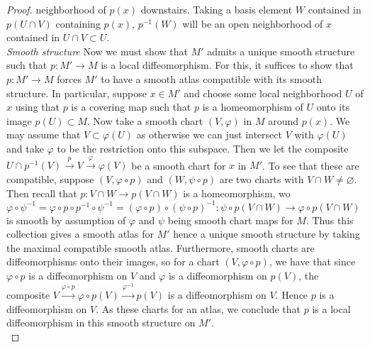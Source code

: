 \documentclass[reqno]{amsart}
\theoremstyle{definition}
\theoremstyle{remark}
\begin{document}
\begin{proof}
        neighborhood of $p(x)$ downstairs. 
        Taking a basis element $W$ contained in
        $p\left( U \cap V \right) $ containing $p(x)$, 
        $p^{-1}(W)$ will be an open neighborhood of
        $x$ contained in $U \cap V \subset U$.\\
        \linebreak
        \textit{Smooth structure}
        Now we must show that $M'$ admits a unique smooth
        structure such that
        $p \colon M' \to M$ is a local diffeomorphism.
        For this, it suffices to show that
        $p \colon M' \to M$ forces $M'$ to have
        a smooth atlas compatible with its smooth structure.
        In particular, suppose
        $x \in M'$ and choose some local neighborhood
        $U$ of $x$
        using that $p$ is a covering map such that
        $p$ is a homeomorphism of $U$ onto its image
        $p(U) \subset M$. Now take a smooth chart
        $\left( V, \varphi  \right) $ in $M$ around
        $p(x)$. We may assume that $V \subset 
        \varphi (U)$ as otherwise we can just intersect
        $V$ with $\varphi (U)$ and take $\varphi $ to
        be the restriction onto this subspace. Then
        we let
        the composite
        $U \cap p^{-1}(V) \stackrel{p }{\to } V
        \stackrel{\varphi }{\to } \varphi (V)$ be a smooth chart
        for $x$ in $M'$. 
        To see that these are compatible, suppose
        $\left( V, \varphi  \circ p \right) $ and
        $\left( W, \psi \circ p \right) $ are
        two charts with $V \cap W \neq \varnothing$.
        Then recall that
        $p \colon V \cap W \to 
        p\left( V \cap W \right) $ is a homeomorphism, wo
        $\varphi \circ \psi^{-1} =
        \varphi \circ p \circ p^{-1} \circ \psi^{-1} 
        = \left( \varphi  \circ p \right) 
        \circ \left( \psi  \circ p \right)^{-1} \colon
        \psi  \circ p \left( V \cap W \right)
        \to \varphi \circ p \left( V \cap W \right) $
        is smooth by assumption of
        $\varphi $ and $\psi $ being smooth chart maps
        for $M$. Thus
        this collection gives a smooth atlas for
        $M'$ hence a unique smooth structure by taking the
        maximal compatible smooth atlas. Furthermore, smooth
        charts
        are diffeomorphisms onto their images, so
        for a chart
        $\left( V, \varphi  \circ p \right) $, we have
        that since $\varphi  \circ p$ is a diffeomorphism on
        $V$ and $\varphi $ is a diffeomorphism on
        $p(V)$, the composite
        $V \stackrel{\varphi \circ p}{\to }
        \varphi \circ p(V) \stackrel{\varphi^{-1}}{\to }
        p(V)$ is a diffeomorphism on $V$. Hence
        $p$ is a diffeomorphism on $V$. As these charts
        for an atlas, we conclude that $p$ is a local diffeomorphism
        in this smooth structure on $M'$.\\





\end{proof}
\end{document}
